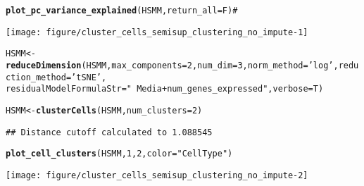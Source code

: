\documentclass[10pt,oneside]{article}\usepackage[]{graphicx}\usepackage[]{color}
\makeatletter
\def\maxwidth{ %
  \ifdim\Gin@nat@width>\linewidth
    \linewidth
  \else
    \Gin@nat@width
  \fi
}
\newcommand{\hlnum}[1]{\textcolor[rgb]{0.686,0.059,0.569}{#1}}%
\newcommand{\hlstr}[1]{\textcolor[rgb]{0.192,0.494,0.8}{#1}}%
\newcommand{\hlcom}[1]{\textcolor[rgb]{0.678,0.584,0.686}{\textit{#1}}}%
\newcommand{\hlstd}[1]{\textcolor[rgb]{0.345,0.345,0.345}{#1}}%
\newcommand{\hlkwb}[1]{\textcolor[rgb]{0.69,0.353,0.396}{#1}}%
\newcommand{\hlkwc}[1]{\textcolor[rgb]{0.333,0.667,0.333}{#1}}%
\newcommand{\hlkwd}[1]{\textcolor[rgb]{0.737,0.353,0.396}{\textbf{#1}}}%
\newenvironment{kframe}{%
 \def\at@end@of@kframe{}%
 \ifinner\ifhmode%
  \def\at@end@of@kframe{\end{minipage}}%
  \begin{minipage}{\columnwidth}%
 \fi\fi%
 \def\FrameCommand##1{\hskip\@totalleftmargin \hskip-\fboxsep
 \colorbox{shadecolor}{##1}\hskip-\fboxsep
     \hskip-\linewidth \hskip-\@totalleftmargin \hskip\columnwidth}%
 \MakeFramed {\advance\hsize-\width
   \@totalleftmargin\z@ \linewidth\hsize
   \@setminipage}}%
 {\par\unskip\endMakeFramed%
 \at@end@of@kframe}
\newenvironment{knitrout}{}{} %
\makeatother
\begin{document}
\begin{knitrout}
\color{fgcolor}\begin{kframe}
\begin{alltt}
\hlkwd{plot_pc_variance_explained}\hlstd{(HSMM,} \hlkwc{return_all} \hlstd{= F)} \hlcom{# }
\end{alltt}
\end{kframe}

{\centering \texttt{[image: figure/cluster\_cells\_semisup\_clustering\_no\_impute-1]} 

}


\begin{kframe}\begin{alltt}
\hlstd{HSMM} \hlkwb{<-} \hlkwd{reduceDimension}\hlstd{(HSMM,} \hlkwc{max_components}\hlstd{=}\hlnum{2}\hlstd{,} \hlkwc{num_dim} \hlstd{=} \hlnum{3}\hlstd{,} \hlkwc{norm_method} \hlstd{=} \hlstr{'log'}\hlstd{,} \hlkwc{reduction_method} \hlstd{=} \hlstr{'tSNE'}\hlstd{,}
                       \hlkwc{residualModelFormulaStr}\hlstd{=}\hlstr{"~Media + num_genes_expressed"}\hlstd{,} \hlkwc{verbose} \hlstd{= T)}
\end{alltt}


{\ttfamily\noindent\itshape\color{messagecolor}{\#\# Removing batch effects}}

{\ttfamily\noindent\itshape\color{messagecolor}{\#\# Remove noise by PCA ...}}

{\ttfamily\noindent\itshape\color{messagecolor}{\#\# Reduce dimension by tSNE ...}}\begin{alltt}
\hlstd{HSMM} \hlkwb{<-} \hlkwd{clusterCells}\hlstd{(HSMM,} \hlkwc{num_clusters}\hlstd{=}\hlnum{2}\hlstd{)}
\end{alltt}
\begin{verbatim}
## Distance cutoff calculated to 1.088545
\end{verbatim}


{\ttfamily\noindent\itshape\color{messagecolor}{\#\# the length of the distance: 34191}}\begin{alltt}
\hlkwd{plot_cell_clusters}\hlstd{(HSMM,} \hlnum{1}\hlstd{,} \hlnum{2}\hlstd{,} \hlkwc{color}\hlstd{=}\hlstr{"CellType"}\hlstd{)}
\end{alltt}
\end{kframe}

{\centering \texttt{[image: figure/cluster\_cells\_semisup\_clustering\_no\_impute-2]} 

}



\end{knitrout}
 
\end{document}
